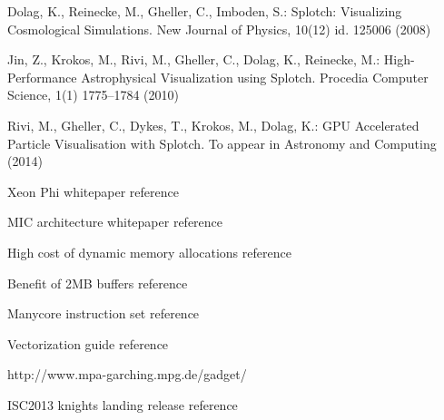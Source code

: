 \documentclass[runningheads,a4paper]{llncs}
\begin{document}


\begin{thebibliography}{4}

Dolag, K., Reinecke, M., Gheller, C., Imboden, S.: Splotch: Visualizing Cosmological Simulations. New Journal of Physics, 10(12)  id. 125006 (2008)

Jin, Z., Krokos, M., Rivi, M., Gheller, C., Dolag, K., Reinecke, M.: High-Performance Astrophysical Visualization using Splotch. 
  Procedia Computer Science, 1(1) 1775--1784 (2010)

Rivi, M., Gheller, C., Dykes, T., Krokos, M., Dolag, K.:  GPU Accelerated
  Particle Visualisation with Splotch. To appear in Astronomy and Computing (2014)
  
 Xeon Phi whitepaper reference

 MIC architecture whitepaper reference 

 High cost of dynamic memory allocations reference

 Benefit of 2MB buffers reference 

 Manycore instruction set reference

 Vectorization guide reference

 http://www.mpa-garching.mpg.de/gadget/

 ISC2013 knights landing release reference






\end{thebibliography}
\end{document}
